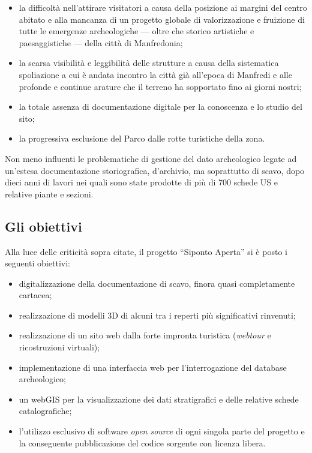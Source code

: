 \documentclass{paper}
\begin{document}
        \begin{itemize}
            \item la difficoltà nell'attirare visitatori a causa della posizione ai margini del centro abitato e alla mancanza di un progetto globale di valorizzazione e fruizione di tutte le emergenze archeologiche --- oltre che storico artistiche e paesaggistiche --- della città di Manfredonia;
            \item la scarsa visibilità e leggibilità delle strutture a causa della sistematica spoliazione a cui è andata incontro la città già all'epoca di Manfredi e alle profonde e continue arature che il terreno ha sopportato fino ai giorni nostri;
            \item la totale assenza di documentazione digitale per la conoscenza e lo studio del sito;
            \item la progressiva esclusione del Parco dalle rotte turistiche della zona.
        \end{itemize}

        Non meno influenti le problematiche di gestione del dato archeologico legate ad un'estesa documentazione storiografica, d'archivio, ma soprattutto di scavo, dopo dieci anni di lavori nei quali sono state prodotte di più di 700 schede US e relative piante e sezioni.

    \subsection{Gli obiettivi}

        Alla luce delle criticità sopra citate, il progetto ``Siponto Aperta'' si è posto i seguenti obiettivi:

        \begin{itemize}
            \item digitalizzazione della documentazione di scavo, finora quasi completamente cartacea;
            \item realizzazione di modelli 3D di alcuni tra i reperti più significativi rinvenuti;
            \item realizzazione di un sito web dalla forte impronta turistica (\textit{webtour} e ricostruzioni virtuali);
            \item implementazione di una interfaccia web per l'interrogazione del database archeologico;
            \item un webGIS per la visualizzazione dei dati stratigrafici e delle relative schede catalografiche;
            \item l'utilizzo esclusivo di software \textit{open source} di ogni singola parte del progetto e la conseguente pubblicazione del codice sorgente con licenza libera.
        \end{itemize}
\end{document}
